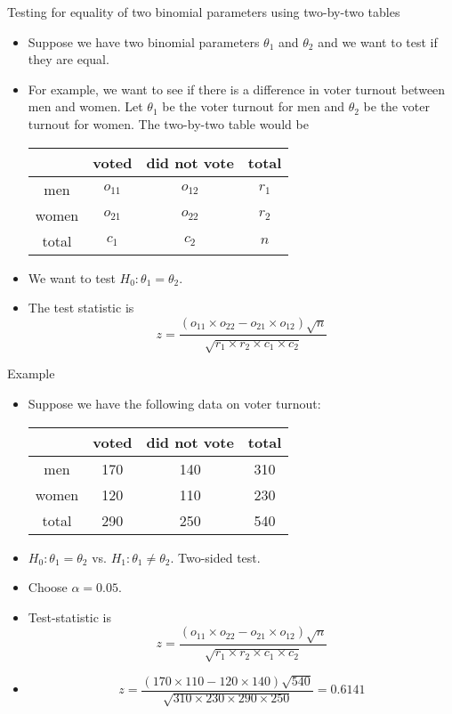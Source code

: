 \documentclass[10pt, handout, xcolor=table]{beamer}
\newcommand*\themecol{\usebeamercolor[fg]{structure}}
\begin{document}
\begin{frame}{Testing for equality of two binomial parameters using two-by-two tables}
\begin{itemize}\itemsep2ex
\item Suppose we have two binomial parameters $\theta_1$ and $\theta_2$ and we want to test if they are equal.
\item For example, we want to see if there is a difference in voter turnout between men and women. Let $\theta_1$ be the voter turnout for men and $\theta_2$ be the voter turnout for women. The two-by-two table would be
\medskip
{\footnotesize
\begin{table}[]
\begin{tabular}{|c|cc|c|}
\hline
      & voted & did not vote & total \\ \hline
men   & $o_{11}$ & $o_{12}$        & $r_1$  \\ 
women & $o_{21}$ & $o_{22}$        & $r_2$  \\ \hline
total & $c_1$  & $c_2$         & $n$     \\ \hline
\end{tabular}
\end{table}
}
\item We want to test $H_0: \theta_1 = \theta_2$.
\item The test statistic is
{\themecol
\[
z = \frac{(o_{11} \times o_{22} - o_{21} \times o_{12})\sqrt{n}}{\sqrt{r_1 \times r_2 \times c_1 \times c_2}}
\]
}
\end{itemize}
\end{frame}

\begin{frame}{Example}
\begin{itemize}
\setlength{\itemsep}{8pt}
\item Suppose we have the following data on voter turnout:
\medskip
{\footnotesize
\begin{table}[]
\begin{tabular}{|c|cc|c|}
\hline
      & voted & did not vote & total \\ \hline
men   & 170 & 140       & 310  \\ 
women & 120 & 110        & 230  \\ \hline
total & 290  & 250        & 540     \\ \hline
\end{tabular}
\end{table}
}
\item<1->[Step 1] $H_0: \theta_1 = \theta_2$ vs. $H_1: \theta_1 \neq \theta_2$. Two-sided test. 
\item<2->[Step 2] Choose $\alpha = 0.05$. 
\item<3->[Step 3] Test-statistic is 
{\small
\[
z = \frac{(o_{11} \times o_{22} - o_{21} \times o_{12})\sqrt{n}}{\sqrt{r_1 \times r_2 \times c_1 \times c_2}}
\]
}
\item<4->[]
{\small
\[
z = \frac{(170 \times 110 - 120 \times 140)\sqrt{540}}{\sqrt{310 \times 230 \times 290 \times 250}} = 0.6141
\]
}
\end{itemize}
\end{frame}
\end{document}
